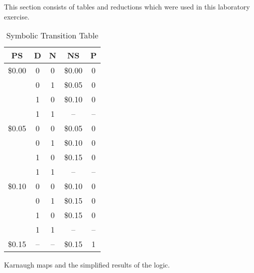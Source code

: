 \begin{CJK}
\newpage %
This section consists of tables and reductions which were used in this laboratory exercise.

	\begin{table}[htbp]
	\begin{center}
		\begin{tabular}{|ccc|cc|}
			\hline
			\textbf{PS} & \textbf{D} & \textbf{N} & \textbf{NS} & \textbf{P} \\ \hline
			\$0.00 & 0 & 0 & \$0.00 & 0 \\
			 & 0 & 1 & \$0.05 & 0 \\
			 & 1 & 0 & \$0.10 & 0 \\
			 & 1 & 1 & -- & -- \\ \hline
			\$0.05 & 0 & 0 & \$0.05 & 0 \\
			 & 0 & 1 & \$0.10 & 0 \\
			 & 1 & 0 & \$0.15 & 0 \\
			 & 1 & 1 & -- & -- \\ \hline
			\$0.10 & 0 & 0 & \$0.10 & 0 \\
			 & 0 & 1 & \$0.15 & 0 \\
			 & 1 & 0 & \$0.15 & 0 \\
			 & 1 & 1 & -- & -- \\ \hline
			\$0.15 & -- & -- & \$0.15 & 1 \\ \hline
			\end{tabular}
	\end{center}
	\caption{Symbolic Transition Table}
	\label{symbolic}
	\end{table}

	\begin{table}[H]
		\centering
		 \hspace{10mm} %
	  \caption{Karnaugh maps and the simplified results of the logic.}
	  \label{fig:kmaps}
	\end{table}



\end{CJK}

